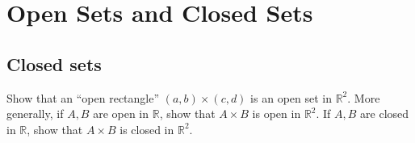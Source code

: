 \chapter{Open Sets and Closed Sets}

\section{Closed sets}

\begin{exercise}{1}
    Show that an ``open rectangle'' $(a, b) \times (c, d)$ is an open set in $\mathbb{R}^2$.
    More generally, if $A, B$ are open in $\mathbb{R}$, show that $A \times B$ is open in $\mathbb{R}^2$.
    If $A, B$ are closed in $\mathbb{R}$, show that $A \times B$ is closed in $\mathbb{R}^2$.
\end{exercise}

